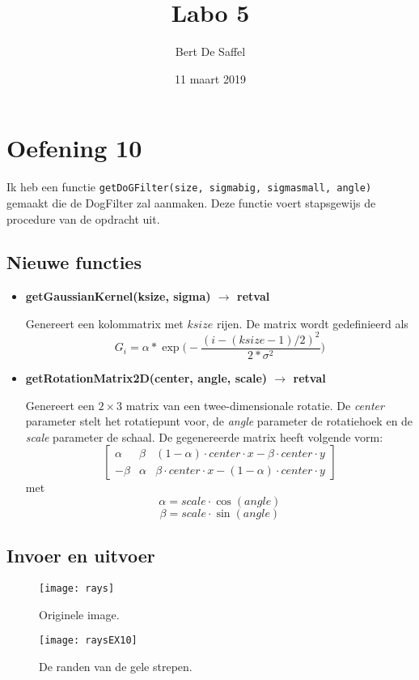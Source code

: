 \documentclass{article}
\begin{document}
	\title{Labo 5}
	\author{Bert De Saffel}
	\date{11 maart 2019}
	\maketitle
	
	\section*{Oefening 10}
	Ik heb een functie \texttt{getDoGFilter(size, sigmabig, sigmasmall, angle)} gemaakt die de DogFilter zal aanmaken. Deze functie voert stapsgewijs de procedure van de opdracht uit. 
	\subsection*{Nieuwe functies}
	\begin{itemize}
		 \item \textbf{getGaussianKernel(ksize, sigma) $\rightarrow$ retval}
		 
		 Genereert een kolommatrix met $ksize$ rijen. De matrix wordt gedefinieerd als
		 $$G_i = \alpha * \exp\bigg(-\frac{(i - (ksize - 1)/2)^2}{2*\sigma^2}\bigg)$$ 
		 \item \textbf{getRotationMatrix2D(center, angle, scale) $\rightarrow$ retval}
		 
		 Genereert een $2 \times 3$ matrix van een twee-dimensionale rotatie. De \textit{center} parameter stelt het rotatiepunt voor, de \textit{angle} parameter de rotatiehoek en de \textit{scale} parameter de schaal. De gegenereerde matrix heeft volgende vorm:
		 $$\begin{bmatrix}
		 \alpha & \beta & (1 - \alpha)\cdot center\cdot x - \beta \cdot center\cdot y \\
		 -\beta & \alpha & \beta\cdot center\cdot x - (1 - \alpha) \cdot center\cdot y
		 \end{bmatrix}$$
		 met
		 $$\alpha = scale\cdot\cos(angle)$$
		 $$\beta = scale\cdot\sin(angle)$$
	\end{itemize}
	
	\subsection*{Invoer en uitvoer}
			\begin{figure}[!htb]
		\begin{minipage}{0.48\textwidth}
			\centering
			\texttt{[image: rays]}
			\caption{Originele image.}
		\end{minipage}\hfill
		\begin{minipage}{0.48\textwidth}
			\centering
			\texttt{[image: raysEX10]}
			\caption{De randen van de gele strepen.}
		\end{minipage}
	\end{figure}
	\newpage
\end{document}
